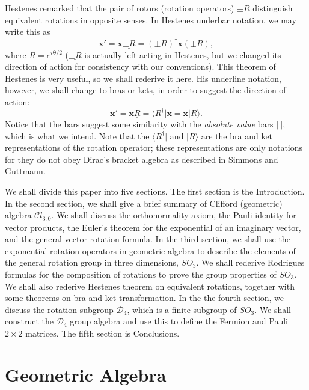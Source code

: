 \documentclass[11pt,twocolumn]{article}
\begin{document}
Hestenes remarked that the pair of rotors (rotation operators) $\pm R$ distinguish equivalent rotations in opposite senses\cite{Hestenes_2002_AGACSEpp3-34_p7}.  In Hestenes underbar notation, we may write this as
\begin{equation}
\label{eq:x' is x R is R dagger x R pm intro}
\mathbf x'=\mathbf x\underline{\pm R}=(\pm R)^\dagger\mathbf x(\pm R),
\end{equation}
where $R=e^{i\bm\theta/2}$ ($\underline{\pm R}$ is actually left-acting in Hestenes, but we changed its direction of action for consistency with our conventions).  This theorem of Hestenes is very useful, so we shall rederive it here.  His underline notation, however, we shall change to bras or kets, in order to suggest the direction of action:
\begin{equation}
\label{eq:x' is x R is bra R x is x ket R}
\mathbf x'=\mathbf x\underline R=\langle R^\dagger|\mathbf x=\mathbf x|R\rangle.
\end{equation}
Notice that the bars suggest some similarity with the \emph{absolute value} bars $|\ |$, which is what we intend.  Note that the $\langle R^\dagger|$ and $|R\rangle$ are the bra and ket representations of the rotation operator; these representations are only notations for they do not obey Dirac's bracket algebra as described in Simmons and Guttmann\cite{SimmonsGuttmann_1970_StatesWavesandPhotons_p48-49}.  

We shall divide this paper into five sections.  The first section is the Introduction.  In the second section, we shall give a brief summary of Clifford (geometric) algebra $\mathcal Cl_{3,0}$.  We shall discuss the orthonormality axiom, the Pauli identity for vector products, the Euler's theorem for the exponential of an imaginary vector, and the general vector rotation formula.  In the third section, we shall use the exponential rotation operators in geometric algebra to describe the elements of the general rotation group in three dimensions, $SO_3$.  We shall rederive Rodrigues formulas for the composition of rotations to prove the group properties of $SO_3$.  We shall also rederive Hestenes theorem on equivalent rotations, together with some theorems on bra and ket transformation.  In the the fourth section, we discuss the rotation subgroup $\mathcal D_4$, which is a finite subgroup of $SO_3$.  We shall construct the $\mathcal D_4$ group algebra and use this to define the Fermion and Pauli $2\times 2$ matrices.  The fifth section is Conclusions.

\section{Geometric Algebra}
\end{document}
